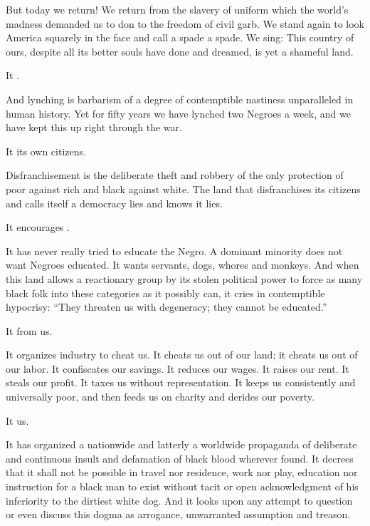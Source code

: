 \documentclass[letterpaper,10pt,english]{jupyterBook}
\begin{document}
\sphinxAtStartPar
But today we return! We return from the slavery of uniform which the world’s madness demanded us to don to the freedom of civil garb. We stand again to look America squarely in the face and call a spade a spade. We sing: This country of ours, despite all its better souls have done and dreamed, is yet a shameful land.

\sphinxAtStartPar
It .

\sphinxAtStartPar
And lynching is barbarism of a degree of contemptible nastiness unparalleled in human history. Yet for fifty years we have lynched two Negroes a week, and we have kept this up right through the war.

\sphinxAtStartPar
It  its own citizens.

\sphinxAtStartPar
Disfranchisement is the deliberate theft and robbery of the only protection of poor against rich and black against white. The land that disfranchises its citizens and calls itself a democracy lies and knows it lies.

\sphinxAtStartPar
It encourages .

\sphinxAtStartPar
It has never really tried to educate the Negro. A dominant minority does not want Negroes educated. It wants servants, dogs, whores and monkeys. And when this land allows a reactionary group by its stolen political power to force as many black folk into these categories as it possibly can, it cries in contemptible hypocrisy: “They threaten us with degeneracy; they cannot be educated.”

\sphinxAtStartPar
It  from us.

\sphinxAtStartPar
It organizes industry to cheat us. It cheats us out of our land; it cheats us out of our labor. It confiscates our savings. It reduces our wages. It raises our rent. It steals our profit. It taxes us without representation. It keeps us consistently and universally poor, and then feeds us on charity and derides our poverty.

\sphinxAtStartPar
It  us.

\sphinxAtStartPar
It has organized a nation\sphinxhyphen{}wide and latterly a world\sphinxhyphen{}wide propaganda of deliberate and continuous insult and defamation of black blood wherever found. It decrees that it shall not be possible in travel nor residence, work nor play, education nor instruction for a black man to exist without tacit or open acknowledgment of his inferiority to the dirtiest white dog. And it looks upon any attempt to question or even discuss this dogma as arrogance, unwarranted assumption and treason.
\end{document}
